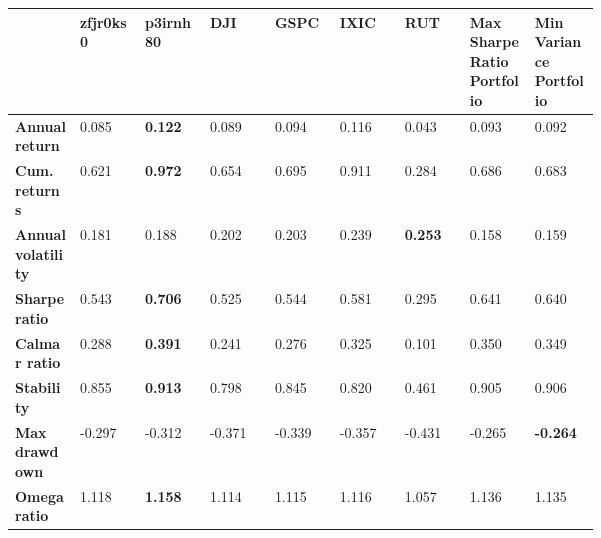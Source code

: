 \documentclass[../xlapes02]{subfiles}
\begin{document}
    \begin{table}[H]
        \centering
        {\footnotesize\begin{tabular}{*{9}{|m{0.075\linewidth}|}}
                          \toprule
                          & \bfseries zfjr0ks0 & \bfseries p3irnh80                   & \bfseries DJI                         & \bfseries GSPC & \bfseries IXIC & \bfseries RUT & \bfseries Max Sharpe Ratio Portfolio & \bfseries Min Variance Portfolio \\[0.4cm]
                          \midrule
                          \bfseries Annual return       & 0.085              & \color[HTML]{00F000} \bfseries 0.122 & 0.089                                 & 0.094          & 0.116 & 0.043 & 0.093 & 0.092 \\[0.4cm]
                          \bfseries Cum.\ returns       & 0.621              & \color[HTML]{00F000} \bfseries 0.972 & 0.654                                 & 0.695          & 0.911 & 0.284 & 0.686 & 0.683 \\[0.4cm]
                          \bfseries Annual volatility   & 0.181              & 0.188                                & 0.202                                 & 0.203          & 0.239          & \color[HTML]{00F000} \bfseries 0.253 & 0.158 & 0.159 \\[0.4cm]
                          \bfseries Sharpe ratio        & 0.543              & \color[HTML]{00F000} \bfseries 0.706 & 0.525                                 & 0.544          & 0.581 & 0.295 & 0.641 & 0.640 \\[0.4cm]
                          \bfseries Calmar ratio        & 0.288              & \color[HTML]{00F000} \bfseries 0.391 & 0.241                                 & 0.276          & 0.325 & 0.101 & 0.350 & 0.349 \\[0.4cm]
                          \bfseries Stability           & 0.855              & \color[HTML]{00F000} \bfseries 0.913 & 0.798                                 & 0.845          & 0.820 & 0.461 & 0.905 & 0.906 \\[0.4cm]
                          \bfseries Max drawdown        & -0.297             & -0.312                               & -0.371                                & -0.339         & -0.357         & -0.431                               & -0.265                               & \color[HTML]{00F000} \bfseries -0.264 \\[0.4cm]
                          \bfseries Omega ratio         & 1.118              & \color[HTML]{00F000} \bfseries 1.158 & 1.114                                 & 1.115          & 1.116 & 1.057 & 1.136 & 1.135 \\[0.4cm]

\end{tabular}}
\end{table}
\end{document}
